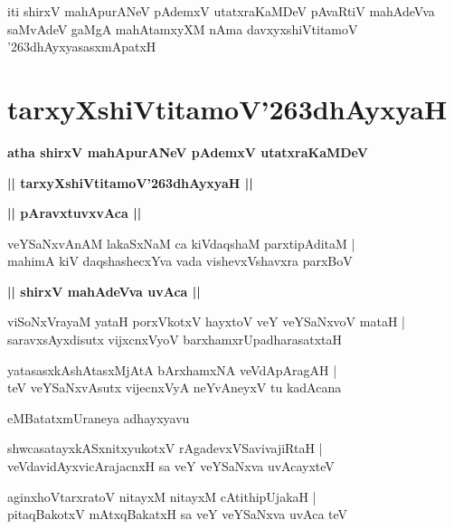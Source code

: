 \documentclass[twoside,12pt,openright]{book}
\def\S{\char'263}
\newcounter{shloka}[chapter]
\def\uvaca#1{\centerline{{\large\textbf{#1}}}}
\begin{document}
\begin{center}
iti shirxV mahApurANeV pAdemxV utatxraKaMDeV pAvaRtiV mahAdeVva saMvAdeV gaMgA mahAtamxyXM nAma 
davxyxshiVtitamoV \S dhAyxyasasxmApatxH 
\end{center}

\chapter{tarxyXshiVtitamoV\S dhAyxyaH}

\begin{center}
{\LARGE\bfseries atha shirxV mahApurANeV pAdemxV utatxraKaMDeV}
\end{center}

\begin{center}
{\LARGE\bfseries || tarxyXshiVtitamoV\S dhAyxyaH || }
\end{center}

\uvaca{|| pAravxtuvxvAca ||}

\begin{shloka}%
veYSaNxvAnAM lakaSxNaM ca kiVdaqshaM parxtipAditaM |\\
mahimA kiV daqshashecxYva vada vishevxVshavxra parxBoV 
\end{shloka}

\uvaca{|| shirxV mahAdeVva uvAca ||}

\begin{shloka}%
viSoNxVrayaM yataH porxVkotxV hayxtoV veY veYSaNxvoV mataH |\\
saravxsAyxdisutx vijxcnxVyoV barxhamxrUpadharasatxtaH 
\end{shloka}

\begin{shloka}%
yatasasxkAshAtasxMjAtA bArxhamxNA veVdApAragAH |\\
teV veYSaNxvAsutx vijecnxVyA neYvAneyxV tu kadAcana
\end{shloka}

\begin{center}
eMBatatxmUraneya adhayxyavu
\end{center}

\begin{shloka}%
shwcasatayxkASxnitxyukotxV rAgadevxVSavivajiRtaH |\\
veVdavidAyxvicArajacnxH sa veY veYSaNxva uvAcayxteV 
\end{shloka}

\begin{shloka}%
aginxhoVtarxratoV nitayxM nitayxM cAtithipUjakaH |\\
pitaqBakotxV mAtxqBakatxH sa veY veYSaNxva uvAca teV 
\end{shloka}
\end{document}
